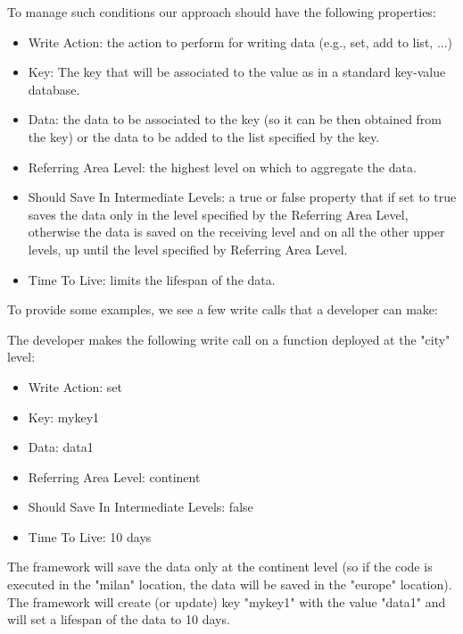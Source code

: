 To manage such conditions our approach should have the following properties:
\begin{itemize}
    \item Write Action: the action to perform for writing data (e.g., set, add to list, ...)
    \item Key: The key that will be associated to the value as in a standard key-value database.
     \item Data: the data to be associated to the key (so it can be then obtained from the key) or the data to be added to the list specified by the key.
     \item Referring Area Level: the highest level on which to aggregate the data.
     \item Should Save In Intermediate Levels: a true or false property that if set to true saves the data only in the level specified by the Referring Area Level, otherwise the data is saved on the receiving level and on all the other upper levels, up until the level specified by Referring Area Level.
     \item Time To Live: limits the lifespan of the data.
\end{itemize}

To provide some examples, we see a few write calls that a developer can make:

\begin{example}
The developer makes the following write call on a function deployed at the "city" level:
\begin{itemize}
    \item Write Action: set
    \item Key: mykey1
    \item Data: data1
    \item Referring Area Level: continent
    \item Should Save In Intermediate Levels: false
    \item Time To Live: 10 days
\end{itemize}
The framework will save the data only at the continent level (so if the code is executed in the "milan" location, the data will be saved in the "europe" location). The framework will create (or update) key "mykey1" with the value "data1" and will set a lifespan of the data to 10 days.
\end{example}

